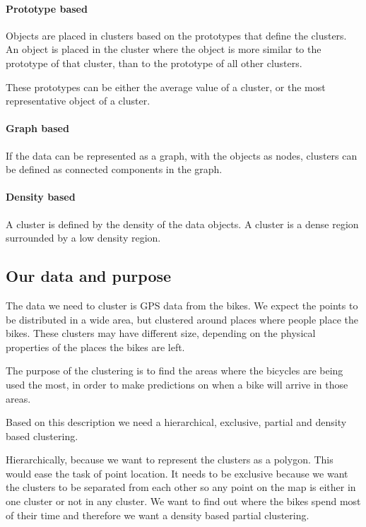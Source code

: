 \paragraph{Prototype based}
Objects are placed in clusters based on the prototypes that define the clusters.
An object is placed in the cluster where the object is more similar to the prototype of that cluster, than to the prototype of all other clusters.

These prototypes can be either the average value of a cluster, or the most representative object of a cluster.

\paragraph{Graph based}
If the data can be represented as a graph, with the objects as nodes, clusters can be defined as connected components in the graph.

\paragraph{Density based}
A cluster is defined by the density of the data objects.
A cluster is a dense region surrounded by a low density region.

\subsection{Our data and purpose}
The data we need to cluster is GPS data from the bikes.
We expect the points to be distributed in a wide area, but clustered around places where people place the bikes.
These clusters may have different size, depending on the physical properties of the places the bikes are left.

The purpose of the clustering is to find the areas where the bicycles are being used the most, in order to make predictions on when a bike will arrive in those areas.

Based on this description we need a hierarchical, exclusive, partial and density based clustering.

Hierarchically, because we want to represent the clusters as a polygon.
This would ease the task of point location.
It needs to be exclusive because we want the clusters to be separated from each other so any point on the map is either in one cluster or not in any cluster.
We want to find out where the bikes spend most of their time and therefore we want a density based partial clustering.

